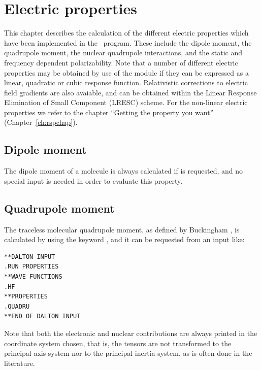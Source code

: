 \chapter{Electric properties}\label{ch:electric}

This chapter describes the calculation of the different electric
properties which have been implemented in the \dalton\ program.
These include the dipole moment, the quadrupole
moment, the nuclear quadrupole
interactions, and the static and frequency dependent
polarizability. Note that a number of different electric
properties may be
obtained by use of the {\resp} module if they can be expressed as a
linear, quadratic or cubic response function.
Relativistic corrections to electric field gradients are also avaiable, and can be
obtained within the Linear Response Elimination of Small Component (LRESC) scheme. \cite{melojcp03}
For the non-linear
electric properties we refer to the chapter ``Getting the property you
want'' (Chapter~\ref{ch:rspchap}).

\section{Dipole moment}\label{sec:dipmom}

The dipole moment of a  molecule is always
calculated if  is
requested, and no special input is needed in order to evaluate this property.

\section{Quadrupole moment}\label{sec:quadmom}

The traceless molecular quadrupole moment, as
defined by Buckingham
\cite{adbacp12}, is calculated by using the keyword , and
it can be requested from an input like:

\begin{verbatim}
**DALTON INPUT
.RUN PROPERTIES
**WAVE FUNCTIONS
.HF
**PROPERTIES
.QUADRU
**END OF DALTON INPUT
\end{verbatim}

Note that both the electronic and nuclear contributions are always
printed in the coordinate system chosen, that is, the tensors are not
transformed to the principal axis system nor to the principal inertia
system, as is often done in the literature.

